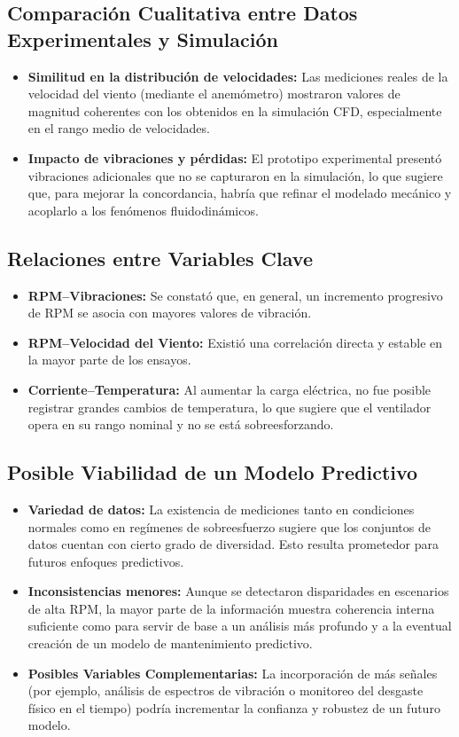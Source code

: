 \subsection{Comparación Cualitativa entre Datos Experimentales y Simulación}
\begin{itemize}
    \item \textbf{Similitud en la distribución de velocidades:} Las mediciones reales de la velocidad del viento (mediante el anemómetro) mostraron valores de magnitud coherentes con los obtenidos en la simulación CFD, especialmente en el rango medio de velocidades.
    \item \textbf{Impacto de vibraciones y pérdidas:} El prototipo experimental presentó vibraciones adicionales que no se capturaron en la simulación, lo que sugiere que, para mejorar la concordancia, habría que refinar el modelado mecánico y acoplarlo a los fenómenos fluidodinámicos.
\end{itemize}

\subsection{Relaciones entre Variables Clave}
\begin{itemize}
    \item \textbf{RPM--Vibraciones:} Se constató que, en general, un incremento progresivo de RPM se asocia con mayores valores de vibración.
    \item \textbf{RPM--Velocidad del Viento:} Existió una correlación directa y estable en la mayor parte de los ensayos.
    \item \textbf{Corriente--Temperatura:} Al aumentar la carga eléctrica, no fue posible registrar grandes cambios de temperatura, lo que sugiere que el ventilador opera en su rango nominal y no se está sobreesforzando.
\end{itemize}

\subsection{Posible Viabilidad de un Modelo Predictivo}
\begin{itemize}
    \item \textbf{Variedad de datos:} La existencia de mediciones tanto en condiciones normales como en regímenes de sobreesfuerzo sugiere que los conjuntos de datos cuentan con cierto grado de diversidad. Esto resulta prometedor para futuros enfoques predictivos.
    \item \textbf{Inconsistencias menores:} Aunque se detectaron disparidades en escenarios de alta RPM, la mayor parte de la información muestra coherencia interna suficiente como para servir de base a un análisis más profundo y a la eventual creación de un modelo de mantenimiento predictivo.
    \item \textbf{Posibles Variables Complementarias:} La incorporación de más señales (por ejemplo, análisis de espectros de vibración o monitoreo del desgaste físico en el tiempo) podría incrementar la confianza y robustez de un futuro modelo.
\end{itemize}

